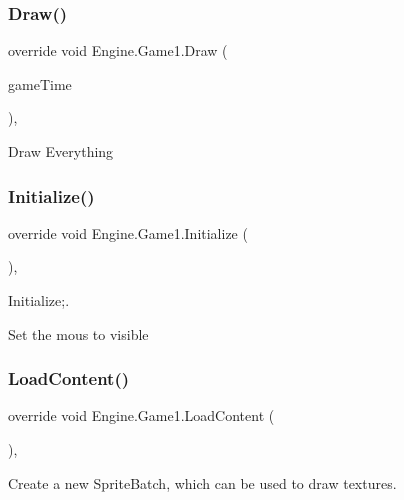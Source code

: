 \subsubsection{\texorpdfstring{Draw()}{Draw()}}
{\footnotesize\ttfamily override void Engine.\+Game1.\+Draw (\begin{DoxyParamCaption}\item[{Game\+Time}]{game\+Time }\end{DoxyParamCaption})\hspace{0.3cm}{\ttfamily [inline]}, {\ttfamily [protected]}}

Draw Everything \mbox{\label{a00040_a640e4df5dfc3ea2b4dab155f3dc3152c}} 
\subsubsection{\texorpdfstring{Initialize()}{Initialize()}}
{\footnotesize\ttfamily override void Engine.\+Game1.\+Initialize (\begin{DoxyParamCaption}{ }\end{DoxyParamCaption})\hspace{0.3cm}{\ttfamily [inline]}, {\ttfamily [protected]}}



Initialize;. 

Set the mous to visible \mbox{\label{a00040_a0c121f8c93986e79a1c402689f53d78e}} 
\subsubsection{\texorpdfstring{Load\+Content()}{LoadContent()}}
{\footnotesize\ttfamily override void Engine.\+Game1.\+Load\+Content (\begin{DoxyParamCaption}{ }\end{DoxyParamCaption})\hspace{0.3cm}{\ttfamily [inline]}, {\ttfamily [protected]}}

Create a new Sprite\+Batch, which can be used to draw textures. \mbox{\label{a00040_a514f0c28029716a22b7e580a06fef9a0}} 
